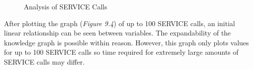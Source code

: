 \begin{figure}[H]
\begin{center}
\end{center}
\vspace{-0.75cm}
\caption{Analysis of SERVICE Calls}
\end{figure}

After plotting the graph (\textit{Figure 9.4}) of up to 100 SERVICE calls, an initial linear relationship can be seen between variables. The expandability of the knowledge graph is possible within reason. However, this graph only plots values for up to 100 SERVICE calls so time required for extremely large amounts of SERVICE calls may differ. 

